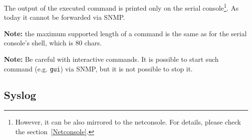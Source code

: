 \documentclass[a4paper, 12pt]{article}
\renewcommand{\_}{\underscore\allowbreak}
\begin{document}
The output of the executed command is printed only on the serial
console\footnote{However, it can be also mirrored to the netconsole.
For details, please check the section~\ref{Netconsole}.}.
As today it cannot be forwarded via SNMP.

\textbf{Note:} the maximum supported length of a command is the same as for
the serial console's shell, which is 80 chars.

\textbf{Note:} Be careful with interactive commands. It is possible to start
such command (e.g. \texttt{gui}) via SNMP, but it is not possible to stop it.

\newpage
\subsection{Syslog}
\label{Syslog}
\end{document}
